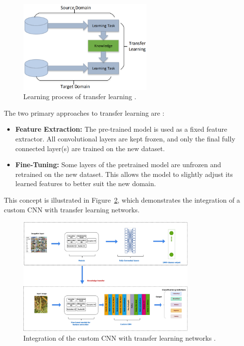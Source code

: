 \begin{figure}[H] %
    \centering
    \includegraphics[width=0.6\textwidth]{chapters/chapter1/images/Figure14.png}
    \caption{Learning process of transfer learning \parencite{tan2018survey}.}
    \label{fig:figure14}
\end{figure}
The two primary approaches to transfer learning are \parencite{tan2018survey}:

\begin{itemize}
    \item \textbf{Feature Extraction:} The pre-trained model is used as a fixed feature extractor. All convolutional layers are kept frozen, and only the final fully connected layer(s) are trained on the new dataset.
    \item \textbf{Fine-Tuning:} Some layers of the pretrained model are unfrozen and retrained on the new dataset. This allows the model to slightly adjust its learned features to better suit the new domain.
\end{itemize}

This concept is illustrated in Figure~\ref{fig:figure15}, which demonstrates the integration of a custom CNN with transfer learning networks.

\begin{figure}[H] %
    \centering
    \includegraphics[width=0.8\textwidth]{chapters/chapter1/images/Figure15.png}
    \caption{Integration of the custom CNN with transfer learning networks \parencite{jouini2024wheat}.}
    \label{fig:figure15}
\end{figure}

